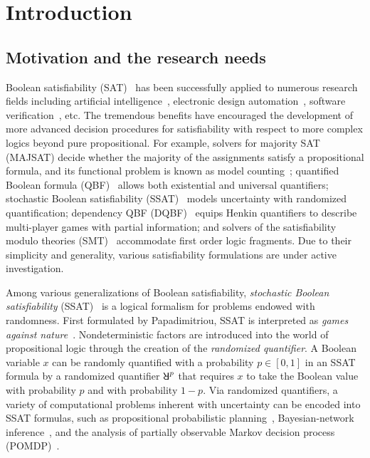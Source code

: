 \chapter{Introduction}
\label{chap:introduction}

\section{Motivation and the research needs}
Boolean satisfiability (SAT)~\cite{SATHandbook} has been successfully applied to numerous research fields
including artificial intelligence~\cite{Nilsson2014,Russell2020},
electronic design automation~\cite{Marques2000,Wang2009},
software verification~\cite{Jhala2009, Berard2013}, etc.
The tremendous benefits have encouraged the development of more advanced decision procedures
for satisfiability with respect to more complex logics beyond pure propositional.
For example,
solvers for majority SAT (MAJSAT) decide whether the majority of the assignments satisfy a propositional formula,
and its functional problem is known as model counting~\cite{SATHandbook-ModelCounting};
quantified Boolean formula (QBF)~\cite{Narizzano2006,SATHandbook-QBF} allows both existential and universal quantifiers;
stochastic Boolean satisfiability (SSAT)~\cite{Littman2001,SATHandbook-SSAT} models uncertainty with randomized quantification;
dependency QBF (DQBF)~\cite{Balabanov2014,Scholl2018} equips Henkin quantifiers to describe multi-player games with partial information;
and solvers of the satisfiability modulo theories (SMT)~\cite{Moura2011,HBMC-SMT} accommodate first order logic fragments.
Due to their simplicity and generality,
various satisfiability formulations are under active investigation.

Among various generalizations of Boolean satisfiability,
\textit{stochastic Boolean satisfiability} (SSAT)~\cite{SATHandbook-SSAT} is a logical formalism
for problems endowed with randomness.
First formulated by Papadimitriou,
SSAT is interpreted as \textit{games against nature}~\cite{Papadimitriou1985}.
Nondeterministic factors are introduced into the world of propositional logic
through the creation of the \textit{randomized quantifier}.
A Boolean variable $x$ can be randomly quantified with a probability $p\in[0,1]$ in an SSAT formula
by a randomized quantifier $\random{p}$ that requires $x$ to take the Boolean value
\true with probability $p$ and
\false with probability $1-p$.
Via randomized quantifiers,
a variety of computational problems inherent with uncertainty can be encoded into SSAT formulas,
such as propositional probabilistic planning~\cite{Littman1998},
Bayesian-network inference~\cite{Cooper1990,Jensen1996,Bacchus2003},
and the analysis of partially observable Markov decision process (POMDP)~\cite{Majercik2003}.

